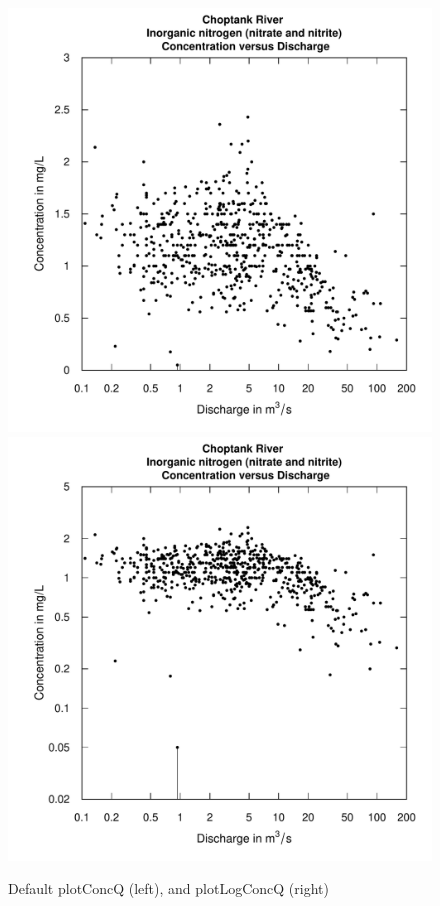 \documentclass[a4paper,11pt]{article}\usepackage{graphicx, color}
\newenvironment{knitrout}{}{} %
\begin{document}
\begin{knitrout}
\color{fgcolor}\begin{figure}[]

\includegraphics[width=.5\linewidth,height=.5\linewidth]{figure/plotConcQ1} 
\includegraphics[width=.5\linewidth,height=.5\linewidth]{figure/plotConcQ2} \caption[Default plotConcQ (left), and plotLogConcQ (right)]{Default plotConcQ (left), and plotLogConcQ (right)\label{fig:plotConcQ}}
\end{figure}


\end{knitrout}
\end{document}
